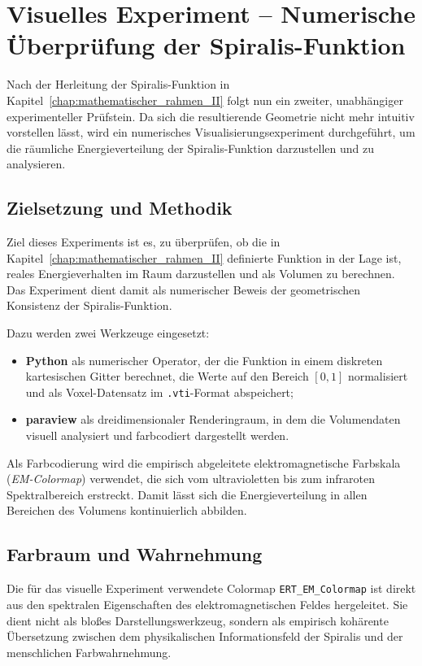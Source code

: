\chapter{Visuelles Experiment – Numerische Überprüfung der Spiralis-Funktion}
\label{chap:visualisierung}

Nach der Herleitung der Spiralis-Funktion in Kapitel~\ref{chap:mathematischer_rahmen_II}
folgt nun ein zweiter, unabhängiger experimenteller Prüfstein.
Da sich die resultierende Geometrie nicht mehr intuitiv vorstellen lässt,
wird ein numerisches Visualisierungsexperiment durchgeführt, um die räumliche
Energieverteilung der Spiralis-Funktion darzustellen und zu analysieren.

\section{Zielsetzung und Methodik}

Ziel dieses Experiments ist es, zu überprüfen, ob die in Kapitel~\ref{chap:mathematischer_rahmen_II}
definierte Funktion in der Lage ist, reales Energieverhalten im Raum
darzustellen und als Volumen zu berechnen.
Das Experiment dient damit als numerischer Beweis der geometrischen Konsistenz
der Spiralis-Funktion.

Dazu werden zwei Werkzeuge eingesetzt:
\begin{itemize}
  \item \textbf{Python} als numerischer Operator, der die Funktion in einem
        diskreten kartesischen Gitter berechnet, die Werte auf den Bereich
        $[0,1]$ normalisiert und als Voxel-Datensatz im \texttt{.vti}-Format
        abspeichert;
  \item \textbf{\gls{paraview}} als dreidimensionaler Renderingraum, in dem die
        Volumendaten visuell analysiert und farbcodiert dargestellt werden.
\end{itemize}

Als Farbcodierung wird die empirisch abgeleitete elektromagnetische Farbskala
(\emph{EM-Colormap}) verwendet, die sich vom ultravioletten bis zum
infraroten Spektralbereich erstreckt.
Damit lässt sich die Energieverteilung in allen Bereichen des Volumens
kontinuierlich abbilden.

\section{Farbraum und Wahrnehmung}

Die für das visuelle Experiment verwendete Colormap \texttt{ERT\_EM\_Colormap} 
ist direkt aus den spektralen Eigenschaften des elektromagnetischen Feldes 
hergeleitet. Sie dient nicht als bloßes Darstellungswerkzeug, 
sondern als empirisch kohärente Übersetzung zwischen 
dem physikalischen Informationsfeld der Spiralis 
und der menschlichen Farbwahrnehmung.

